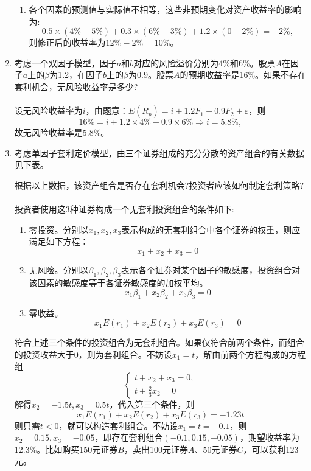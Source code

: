 \begin{enumerate}
\begin{enumerate}[label=(\arabic*)]
        \item 各个因素的预测值与实际值不相等，这些非预期变化对资产收益率的影响为:
        \[0.5 \times (4\% - 5\%) + 0.3 \times (6\% - 3\%) + 1.2 \times (0 - 2\%)= -2\%,\]
        则修正后的收益率为$12\%-2\%=10\%$。
    \end{enumerate}
    \item 考虑一个双因子模型，因子$a$和$b$对应的风险溢价分别为4\%和6\%。股票$A$在因子$a$上的$\beta$为1.2，在因子$b$上的$\beta$为0.9。股票$A$的预期收益率是16\%。如果不存在套利机会，无风险收益率是多少?\\
    \sol\\
    设无风险收益率为$i$，由题意：$E(R_p) = i + 1.2 F_1 + 0.9 F_2 + \varepsilon$，则
    \[16\% = i + 1.2 \times 4\% + 0.9 \times 6\% \Rightarrow i = 5.8\%,\]
    故无风险收益率是5.8\%。
    \item 考虑单因子套利定价模型，由三个证券组成的充分分散的资产组合的有关数据见下表。
    \begin{center}
    \end{center}
    根据以上数据，该资产组合是否存在套利机会?投资者应该如何制定套利策略?\\
    \sol\\
    投资者使用这3种证券构成一个无套利投资组合的条件如下:
    \begin{enumerate}[label=(\arabic*)]
        \item 零投资。分别以$x_1, x_2, x_3$表示构成的无套利组合中各个证券的权重，则应满足如下方程：
        \[x_1+x_2+x_3=0\]
        \item 无风险。分别以$\beta_1,\beta_2,\beta_3$表示各个证券对某个因子的敏感度，投资组合对该因素的敏感度等于各证券敏感度的加权平均。
        \[x_1\beta_1+x_2\beta_2+x_3\beta_3=0\]
        \item 零收益。
        \[x_1E(r_1) + x_2 E(r_2) + x_3 E(r_3) = 0\]
    \end{enumerate}
    符合上述三个条件的投资组合为无套利组合。如果仅符合前两个条件，而组合的投资收益大于0，则为套利组合。不妨设$x_1 = t$，解由前两个方程构成的方程组
    \[\begin{cases}
        t + x_2 + x_3 = 0,\\
        \displaystyle t + \frac{2}{3}x_2 = 0
    \end{cases}\]
    解得$x_2 = -1.5t, x_3 = 0.5t$，代入第三个条件，则
    \[x_1E(r_1) + x_2 E(r_2) + x_3 E(r_3) = -1.23t\]
    则只需$t<0$，就可以构造套利组合。不妨设$x_1 = t = -0.1$，则$x_2 = 0.15, x_3 = -0.05$，即存在套利组合$(-0.1,0.15,-0.05)$，期望收益率为12.3\%。比如购买150元证券$B$，卖出100元证券$A$、50元证券$C$，可以获利123元。
\end{enumerate}
\clearpage